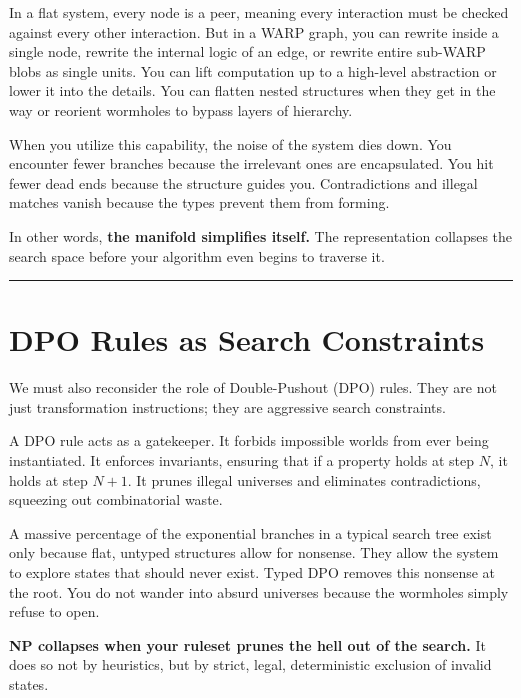 In a flat system, every node is a peer, meaning every interaction must be checked against every other interaction. But in a WARP graph, you can rewrite inside a single node, rewrite the internal logic of an edge, or rewrite entire sub-WARP blobs as single units. You can lift computation up to a high-level abstraction or lower it into the details. You can flatten nested structures when they get in the way or reorient wormholes to bypass layers of hierarchy.

When you utilize this capability, the noise of the system dies down. You encounter fewer branches because the irrelevant ones are encapsulated. You hit fewer dead ends because the structure guides you. Contradictions and illegal matches vanish because the types prevent them from forming.

In other words, \textbf{the manifold simplifies itself.} The representation collapses the search space before your algorithm even begins to traverse it.

\begin{center}\rule{0.5\linewidth}{0.5pt}\end{center}

\section{\texorpdfstring{\textbf{DPO Rules as Search Constraints}}{10.6 --- DPO Rules as Search Constraints}}

We must also reconsider the role of Double-Pushout (DPO) rules. They are not just transformation instructions; they are aggressive search constraints.

A DPO rule acts as a gatekeeper. It forbids impossible worlds from ever being instantiated. It enforces invariants, ensuring that if a property holds at step $N$, it holds at step $N+1$. It prunes illegal universes and eliminates contradictions, squeezing out combinatorial waste.

A massive percentage of the exponential branches in a typical search tree exist only because flat, untyped structures allow for nonsense. They allow the system to explore states that should never exist. Typed DPO removes this nonsense at the root. You do not wander into absurd universes because the wormholes simply refuse to open.

\textbf{NP collapses when your ruleset prunes the hell out of the search.} It does so not by heuristics, but by strict, legal, deterministic exclusion of invalid states.

